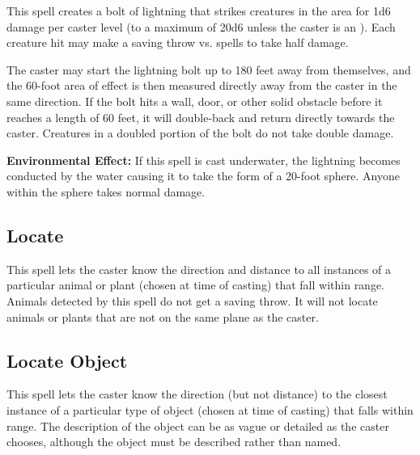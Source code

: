 \begin{multicols*}{2}
This spell creates a bolt of lightning that strikes creatures in the area for 1d6 damage per caster level (to a maximum of 20d6 unless the caster is an ). Each creature hit may make a saving throw vs. spells to take half damage.

The caster may start the lightning bolt up to 180 feet away from themselves, and the 60-foot area of effect is then measured directly away from the caster in the same direction. If the bolt hits a wall, door, or other solid obstacle before it reaches a length of 60 feet, it will double-back and return directly towards the caster. Creatures in a doubled portion of the bolt do not take double damage.

\textbf{Environmental Effect:} If this spell is cast underwater, the lightning becomes conducted by the water causing it to take the form of a 20-foot sphere. Anyone within the sphere takes normal damage.

\subsection{Locate}\label{spell:Locate}

This spell lets the caster know the direction and distance to all instances of a particular animal or plant (chosen at time of casting) that fall within range. Animals detected by this spell do not get a saving throw. It will not locate animals or plants that are not on the same plane as the caster.

\subsection{Locate Object}\label{spell:Locate Object}

This spell lets the caster know the direction (but not distance) to the closest instance of a particular type of object (chosen at time of casting) that falls within range. The description of the object can be as vague or detailed as the caster chooses, although the object must be described rather than named.


\end{multicols*}
